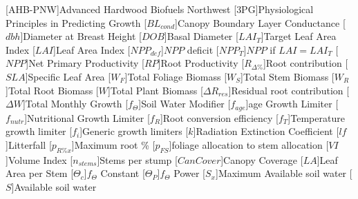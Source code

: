 \usepackage[printonlyused]{acronym}
[AHB-PNW]{Advanced Hardwood Biofuels Northwest}
[\textsc{3PG}]{Physiological Principles in Predicting Growth}
[\ensuremath{BL_{cond}}]{Canopy Boundary Layer Conductance}
[\ensuremath{dbh}]{Diameter at Breast Height}
[\ensuremath{DOB}]{Basal Diameter}
[\ensuremath{LAI_{T}}]{Target Leaf Area Index}
[\ensuremath{LAI}]{Leaf Area Index}
[\ensuremath{NPP_{def}}]{$NPP$ deficit}
[\ensuremath{NPP_{T}}]{$NPP$ if $LAI = LAI_{T}$}
[\ensuremath{NPP}]{Net Primary Productivity}
[\ensuremath{RP}]{Root Productivity}
[\ensuremath{R_{\Delta\%}}]{Root contribution}
[\ensuremath{SLA}]{Specific Leaf Area}
[\ensuremath{W_F}]{Total Foliage Biomass}
[\ensuremath{W_S}]{Total Stem Biomass}
[\ensuremath{W_R}]{Total Root Biomass}
[\ensuremath{W}]{Total Plant Biomass}
[\ensuremath{\Delta R_{res}}]{Residual root contribution}
[\ensuremath{\Delta W}]{Total Monthly Growth}
[\ensuremath{f_\Theta}]{Soil Water Modifier}
[\ensuremath{f_{age}}]{age Growth Limiter}
[\ensuremath{f_{nutr}}]{Nutritional Growth Limiter}
[\ensuremath{f_R}]{Root conversion efficiency}
[\ensuremath{f_T}]{Temperature growth limiter}
[\ensuremath{f_i}]{Generic growth limiters}
[\ensuremath{k}]{Radiation Extinction Coefficient}
[\ensuremath{lf}]{Litterfall}
[\ensuremath{p_{R\%x}}]{Maximum root \%}
[\ensuremath{p_{FS}}]{foliage allocation to stem allocation}
[\ensuremath{VI}]{Volume Index}
[\ensuremath{n_{stems}}]{Stems per stump}
[\ensuremath{CanCover}]{Canopy Coverage}
[\ensuremath{LA}]{Leaf Area per Stem}
[\ensuremath{\Theta_{c}}]{$f_\Theta$ Constant}
[\ensuremath{\Theta_{P}}]{$f_\Theta$ Power}
[\ensuremath{S_x}]{Maximum Available soil water}
[\ensuremath{S}]{Available soil water}

